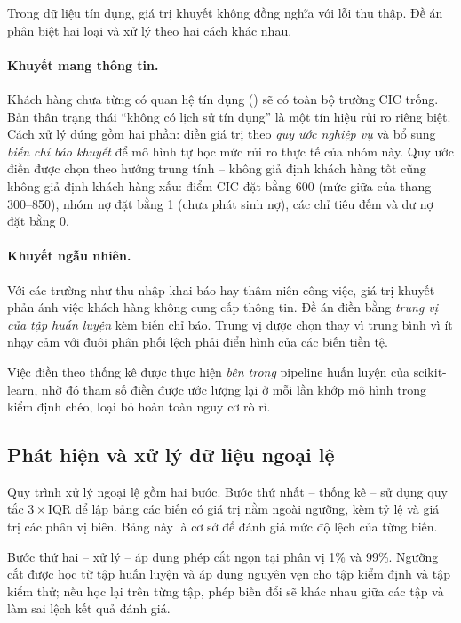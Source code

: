 Trong dữ liệu tín dụng, giá trị khuyết không đồng nghĩa với lỗi thu thập. Đề án
phân biệt hai loại và xử lý theo hai cách khác nhau.

\paragraph{Khuyết mang thông tin.} Khách hàng chưa từng có quan hệ tín dụng
() sẽ có toàn bộ trường CIC trống. Bản thân trạng thái ``không có
lịch sử tín dụng'' là một tín hiệu rủi ro riêng biệt. Cách xử lý đúng gồm hai
phần: điền giá trị theo \textit{quy ước nghiệp vụ} và bổ sung \textit{biến chỉ
báo khuyết} để mô hình tự học mức rủi ro thực tế của nhóm này. Quy ước điền được
chọn theo hướng trung tính -- không giả định khách hàng tốt cũng không giả định
khách hàng xấu: điểm CIC đặt bằng 600 (mức giữa của thang 300--850), nhóm nợ đặt
bằng 1 (chưa phát sinh nợ), các chỉ tiêu đếm và dư nợ đặt bằng 0.

\paragraph{Khuyết ngẫu nhiên.} Với các trường như thu nhập khai báo hay thâm niên
công việc, giá trị khuyết phản ánh việc khách hàng không cung cấp thông tin. Đề
án điền bằng \textit{trung vị của tập huấn luyện} kèm biến chỉ báo. Trung vị được
chọn thay vì trung bình vì ít nhạy cảm với đuôi phân phối lệch phải điển hình của
các biến tiền tệ.

Việc điền theo thống kê được thực hiện \textit{bên trong} pipeline huấn luyện của
scikit-learn, nhờ đó tham số điền được ước lượng lại ở mỗi lần khớp mô hình trong
kiểm định chéo, loại bỏ hoàn toàn nguy cơ rò rỉ.

\subsection{Phát hiện và xử lý dữ liệu ngoại lệ}
\label{subsec:xu-ly-ngoai-le}

Quy trình xử lý ngoại lệ gồm hai bước. Bước thứ nhất -- thống kê -- sử dụng quy
tắc $3 \times \text{IQR}$ để lập bảng các biến có giá trị nằm ngoài ngưỡng, kèm
tỷ lệ và giá trị các phân vị biên. Bảng này là cơ sở để đánh giá mức độ lệch của
từng biến.

Bước thứ hai -- xử lý -- áp dụng phép cắt ngọn tại phân vị 1\% và 99\%. Ngưỡng
cắt được học từ tập huấn luyện và áp dụng nguyên vẹn cho tập kiểm định và tập
kiểm thử; nếu học lại trên từng tập, phép biến đổi sẽ khác nhau giữa các tập và
làm sai lệch kết quả đánh giá.

